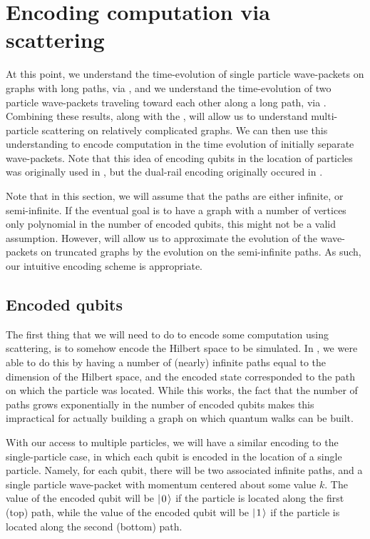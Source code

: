 \documentclass[../thesis-main/thesis-main]{subfiles}
\begin{document}
\section{Encoding computation via scattering}

At this point, we understand the time-evolution of single particle wave-packets on graphs with long paths, via , and we understand the time-evolution of two particle wave-packets traveling toward each other along a long path, via .  Combining these results, along with the , will allow us to understand multi-particle scattering on relatively complicated graphs.  We can then use this understanding to encode computation in the time evolution of initially separate wave-packets.  Note that this idea of encoding qubits in the location of particles was originally used in \cite{Chi09}, but the dual-rail encoding originally occured in \cite{MPQW}.

Note that in this section, we will assume that the paths are either infinite, or semi-infinite.  If the eventual goal is to have a graph with a number of vertices only polynomial in the number of encoded qubits, this might not be a valid assumption.  However,  will allow us to approximate the evolution of the wave-packets on truncated graphs by the evolution on the semi-infinite paths.  As such, our intuitive encoding scheme is appropriate.


\subsection{Encoded qubits}

The first thing that we will need to do to encode some computation using scattering, is to somehow encode the Hilbert space to be simulated.  In , we were able to do this by having a number of (nearly) infinite paths equal to the dimension of the Hilbert space, and the encoded state corresponded to the path on which the particle was located.  While this works, the fact that the number of paths grows exponentially in the number of encoded qubits makes this impractical for actually building a graph on which quantum walks can be built. 

With our access to multiple particles, we will have a similar encoding to the single-particle case, in which each qubit is encoded in the location of a single particle.  Namely, for each qubit, there will be two associated infinite paths, and a single particle wave-packet with momentum centered about some value $k$.  The value of the encoded qubit will be $|\mspace{2mu} 0 \mspace{2mu} \rangle$ if the particle is located along the first (top) path, while the value of the encoded qubit will be $|\mspace{2mu} 1 \mspace{2mu} \rangle$ if the particle is located along the second (bottom) path.
\end{document}

